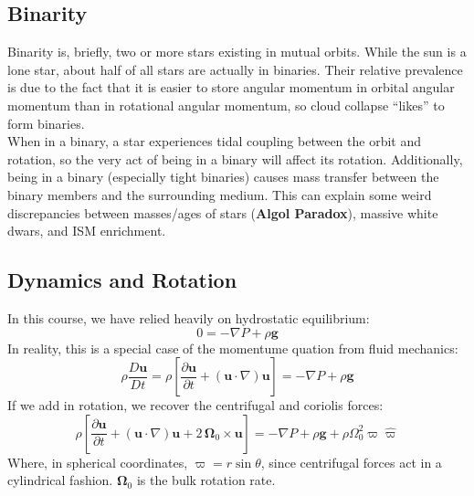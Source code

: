 \documentclass[10pt]{article}
\numberwithin{equation}{section}
\newcommand{\n}{\noindent}
\begin{document}
  \subsection{Binarity} %
  \label{sub:binarity}
  Binarity is, briefly, two or more stars existing in mutual orbits. While the
  sun is a lone star, about half of all stars are actually in binaries. Their
  relative prevalence is due to the fact that it is easier to store angular
  momentum in orbital angular momentum than in rotational angular momentum, so
  cloud collapse ``likes'' to form binaries.\\
  
  \n When in a binary, a star experiences tidal coupling between the
  orbit and rotation, so the very act of being in a binary will affect its
  rotation. Additionally, being in a binary (especially tight binaries) causes
  mass transfer between the binary members and the surrounding medium. This can
  explain some weird discrepancies between masses/ages of stars (\textbf{Algol
  Paradox}), massive white dwars, and ISM enrichment.
  \subsection{Dynamics and Rotation} %
  \label{sub:dynamics_and_rotation}
  In this course, we have relied heavily on hydrostatic equilibrium:
  \begin{equation}
    \label{dr:1} 0 = -\nabla P + \rho\mathbf{g}
  \end{equation}
  In reality, this is a special case of the momentume quation from fluid
  mechanics:
  \begin{equation}
    \label{dr:2} \rho\frac{D\mathbf{u}}{Dt} = \rho\left[\frac{\partial
    \mathbf{u}}{\partial t} + (\mathbf{u}\cdot\nabla) \mathbf{u}\right] =
    -\nabla P + \rho\mathbf{g}
  \end{equation}
  If we add in rotation, we recover the centrifugal and coriolis forces:
  \begin{equation}
    \label{dr:3}\rho\left[\frac{\partial
    \mathbf{u}}{\partial t} + (\mathbf{u}\cdot\nabla) \mathbf{u} + 2\,
    \bm{\Omega}_0\times \mathbf{u}\right] = -\nabla P + \rho\mathbf{g} +\rho
    \Omega_0^2 \varpi \hat{\varpi}
  \end{equation}
  Where, in spherical coordinates, $\varpi = r\sin\theta$, since centrifugal
  forces act in a cylindrical fashion. $\bm{\Omega}_0$ is the bulk rotation
  rate.\\
  
\end{document}
